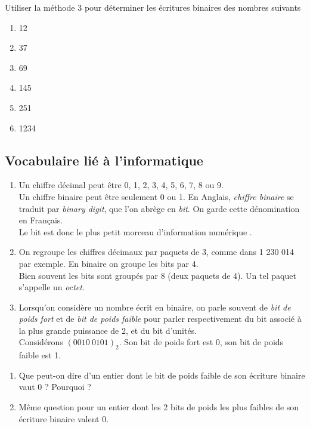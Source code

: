 \documentclass[a4paper,12pt,french]{book}
\begin{document}
\begin{exercice}[]
	Utiliser la méthode 3 pour déterminer les écritures binaires des nombres suivants
	\begin{multicols}{3}
		\begin{enumerate}[\bfseries 1.]
			\item 	12
			\item 	37
			\item 	69
			\item 	145
			\item	251
			\item 	1234
		\end{enumerate}
	\end{multicols}
\end{exercice}
\subsection{Vocabulaire lié à l'informatique}

\begin{enumerate}[--]
\item 	Un chiffre décimal peut être 0, 1, 2, 3, 4, 5, 6, 7, 8 ou 9.\\
		Un chiffre binaire peut être seulement 0 ou 1. En Anglais, \textit{chiffre binaire} se traduit par \textit{binary digit}, 
		que l'on abrège en \textit{bit}. On garde cette dénomination en Français.\\
		Le bit est donc \og le plus petit morceau d'information numérique \fg{}.
\item 	On regroupe les chiffres décimaux par paquets de 3, comme dans 1 230 014 par exemple.
		En binaire on groupe les bits par 4.\\
		Bien souvent les bits sont groupés par 8 (deux paquets de 4). Un tel paquet s'appelle un \textit{octet}.
\item 	Lorsqu'on considère un nombre écrit en binaire, on parle souvent de \textit{bit de poids fort} et de 
\textit{bit de poids faible} pour parler respectivement du bit associé à la plus grande puissance de 2, et du bit 
d'unités.\\
		Considérons $(0010\ 0101)_2$. Son bit de poids fort est 0, son bit de poids faible est 1.
\end{enumerate}

\begin{exercice}[]
\begin{enumerate}[\bfseries 1.]
	\item 	Que peut-on dire d'un entier dont le bit de poids faible de son écriture binaire vaut 0 ? Pourquoi ?
	\item 	Même question pour un entier dont les 2 bits de poids les plus faibles de son écriture binaire valent 0.
\end{enumerate}
\end{exercice}
\end{document}
